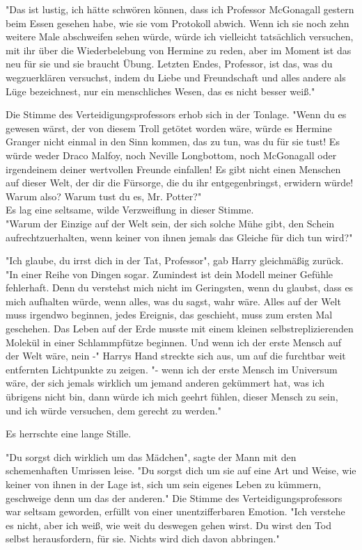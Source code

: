 {"Das ist lustig, ich hätte schwören können, dass ich Professor McGonagall gestern beim Essen gesehen habe, wie sie vom Protokoll abwich. Wenn ich sie noch zehn weitere Male abschweifen sehen würde, würde ich vielleicht tatsächlich versuchen, mit ihr über die Wiederbelebung von Hermine zu reden, aber im Moment ist das neu für sie und sie braucht Übung. Letzten Endes, Professor, ist das, was du wegzuerklären versuchst, indem du Liebe und Freundschaft und alles andere als Lüge bezeichnest, nur ein menschliches Wesen, das es nicht besser weiß."

Die Stimme des Verteidigungsprofessors erhob sich in der Tonlage. "Wenn du es gewesen wärst, der von diesem Troll getötet worden wäre, würde es Hermine Granger nicht einmal in den Sinn kommen, das zu tun, was du für sie tust! Es würde weder Draco Malfoy, noch Neville Longbottom, noch McGonagall oder irgendeinem deiner wertvollen Freunde einfallen! Es gibt nicht einen Menschen auf dieser Welt, der dir die Fürsorge, die du ihr entgegenbringst, erwidern würde! Warum also? Warum tust du es, Mr. Potter?"\\ Es lag eine seltsame, wilde Verzweiflung in dieser Stimme.\\ "Warum der Einzige auf der Welt sein, der sich solche Mühe gibt, den Schein aufrechtzuerhalten, wenn keiner von ihnen jemals das Gleiche für dich tun wird?"

"Ich glaube, du irrst dich in der Tat, Professor", gab Harry gleichmäßig zurück. "In einer Reihe von Dingen sogar. Zumindest ist dein Modell meiner Gefühle fehlerhaft. Denn du verstehst mich nicht im Geringsten, wenn du glaubst, dass es mich aufhalten würde, wenn alles, was du sagst, wahr wäre. Alles auf der Welt muss irgendwo beginnen, jedes Ereignis, das geschieht, muss zum ersten Mal geschehen. Das Leben auf der Erde musste mit einem kleinen selbstreplizierenden Molekül in einer Schlammpfütze beginnen. Und wenn ich der erste Mensch auf der Welt wäre, nein -" Harrys Hand streckte sich aus, um auf die furchtbar weit entfernten Lichtpunkte zu zeigen. "- wenn ich der erste Mensch im Universum wäre, der sich jemals wirklich um jemand anderen gekümmert hat, was ich übrigens nicht bin, dann würde ich mich geehrt fühlen, dieser Mensch zu sein, und ich würde versuchen, dem gerecht zu werden."

Es herrschte eine lange Stille.

"Du sorgst dich wirklich um das Mädchen", sagte der Mann mit den schemenhaften Umrissen leise. "Du sorgst dich um sie auf eine Art und Weise, wie keiner von ihnen in der Lage ist, sich um sein eigenes Leben zu kümmern, geschweige denn um das der anderen." Die Stimme des Verteidigungsprofessors war seltsam geworden, erfüllt von einer unentzifferbaren Emotion. "Ich verstehe es nicht, aber ich weiß, wie weit du deswegen gehen wirst. Du wirst den Tod selbst herausfordern, für sie. Nichts wird dich davon abbringen."

}
